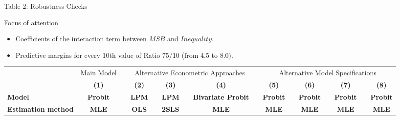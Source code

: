 \documentclass{beamer}
\begin{document}
\begin{frame}{Table 2: Robustness Checks}

\begin{block}{\centering Focus of attention}
\begin{itemize}
\item \footnotesize Coefficients of the interaction term between $MSB$ and $Inequality$.
\item \footnotesize Predictive margins for every 10th value of Ratio 75/10 (from 4.5 to 8.0).
\end{itemize}
\end{block}

\vspace{0.3cm}
\begin{table}[htbp]
  \centering
\vspace*{-2mm}
 \begin{adjustbox}{max width=\textwidth}
    \begin{tabular}{llllllllllllllll}
    \toprule
          & Main Model &       & \multicolumn{5}{c}{Alternative Econometric Approaches} &       & \multicolumn{7}{c}{Alternative Model Specifications} \\
\cmidrule{2-2}\cmidrule{4-8}\cmidrule{10-16}          & \multicolumn{1}{c}{\textbf{(1)}} &       & \multicolumn{1}{c}{\textbf{(2)}} &       & \multicolumn{1}{c}{\textbf{(3)}} &       & \multicolumn{1}{c}{\textbf{(4)}} &       & \multicolumn{1}{c}{\textbf{(5)}} &       & \multicolumn{1}{c}{\textbf{(6)}} &       & \multicolumn{1}{c}{\textbf{(7)}} &       & \multicolumn{1}{c}{\textbf{(8)}} \\
    \textbf{Model} & \multicolumn{1}{c}{\textbf{Probit}} &       & \multicolumn{1}{c}{\textbf{LPM}} &       & \multicolumn{1}{c}{\textbf{LPM}} &       & \multicolumn{1}{c}{\textbf{Bivariate Probit}} &       & \multicolumn{1}{c}{\textbf{Probit}} &       & \multicolumn{1}{c}{\textbf{Probit}} &       & \multicolumn{1}{c}{\textbf{Probit}} &       & \multicolumn{1}{c}{\textbf{Probit}} \\
    \textbf{Estimation method} & \multicolumn{1}{c}{\textbf{MLE}} &       & \multicolumn{1}{c}{\textbf{OLS}} &       & \multicolumn{1}{c}{\textbf{2SLS}} &       & \multicolumn{1}{c}{\textbf{MLE}} &       & \multicolumn{1}{c}{\textbf{MLE}} &       & \multicolumn{1}{c}{\textbf{MLE}} &       & \multicolumn{1}{c}{\textbf{MLE}} &       & \multicolumn{1}{c}{\textbf{MLE}} \\

\end{tabular}
\end{adjustbox}
\end{table}
\end{frame}
\end{document}
